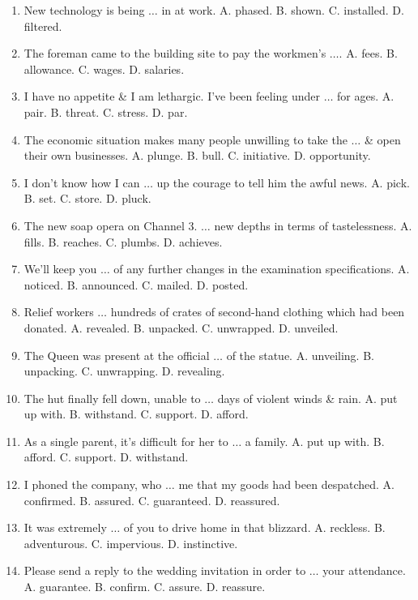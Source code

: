 \documentclass{article}
\numberwithin{equation}{section}
\begin{document}
\begin{enumerate}[leftmargin=2mm]
	\item New technology is being $\ldots$ in at work. {\sf A.} phased. {\sf B.} shown. {\sf C.} installed. {\sf D.} filtered.
	\item The foreman came to the building site to pay the workmen's $\ldots$. {\sf A.} fees. {\sf B.} allowance. {\sf C.} wages. {\sf D.} salaries.
	\item I have no appetite \& I am lethargic. I've been feeling under $\ldots$ for ages. {\sf A.} pair. {\sf B.} threat. {\sf C.} stress. {\sf D.} par.
	\item The economic situation makes many people unwilling to take the $\ldots$ \& open their own businesses. {\sf A.} plunge. {\sf B.} bull. {\sf C.} initiative. {\sf D.} opportunity.
	\item I don't know how I can $\ldots$ up the courage to tell him the awful news. {\sf A.} pick. {\sf B.} set. {\sf C.} store. {\sf D.} pluck.
	\item The new soap opera on Channel 3. $\ldots$ new depths in terms of tastelessness. {\sf A.} fills. {\sf B.} reaches. {\sf C.} plumbs. {\sf D.} achieves.
	\item We'll keep you $\ldots$ of any further changes in the examination specifications. {\sf A.} noticed. {\sf B.} announced. {\sf C.} mailed. {\sf D.} posted.
	\item Relief workers $\ldots$ hundreds of crates of second-hand clothing which had been donated. {\sf A.} revealed. {\sf B.} unpacked. {\sf C.} unwrapped. {\sf D.} unveiled.
	\item The Queen was present at the official $\ldots$ of the statue. {\sf A.} unveiling. {\sf B.} unpacking. {\sf C.} unwrapping. {\sf D.} revealing.
	\item The hut finally fell down, unable to $\ldots$ days of violent winds \& rain. {\sf A.} put up with. {\sf B.} withstand. {\sf C.} support. {\sf D.} afford.
	\item As a single parent, it's difficult for her to $\ldots$ a family. {\sf A.} put up with. {\sf B.} afford. {\sf C.} support. {\sf D.} withstand.
	\item I phoned the company, who $\ldots$ me that my goods had been despatched. {\sf A.} confirmed. {\sf B.} assured. {\sf C.} guaranteed. {\sf D.} reassured.
	\item It was extremely $\ldots$ of you to drive home in that blizzard. {\sf A.} reckless. {\sf B.} adventurous. {\sf C.} impervious. {\sf D.} instinctive.
	\item Please send a reply to the wedding invitation in order to $\ldots$ your attendance. {\sf A.} guarantee. {\sf B.} confirm. {\sf C.} assure. {\sf D.} reassure.

\end{enumerate}
\end{document}
